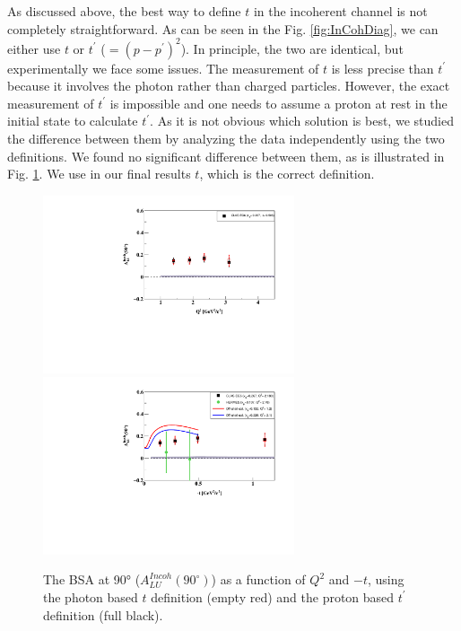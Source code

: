 \documentclass[aps,prc,preprint,superscriptaddress]{revtex4}
\begin{document}

As discussed above, the best way to define $t$ in the incoherent channel is not completely
straightforward. As can be seen in the Fig. \ref{fig:InCohDiag}, 
we can either use $t$ or $t^\prime$ ($= (p - p^\prime)^2$). In principle, the two are 
identical, but experimentally we face some issues. The measurement of $t$ is less precise than
$t^\prime$ because it involves the photon rather than charged particles. However, the 
exact measurement of $t^\prime$ is impossible and one needs to assume a proton at rest
in the initial state to calculate $t^\prime$. As it is not obvious which solution is best,
we studied the difference between them by analyzing the data independently using the two 
definitions. We found no significant difference between them, as is 
illustrated in Fig. \ref{fig:ttpComp}. We use in our final results $t$,
which is the correct definition.

\begin{figure}[tbp!]
\center
\includegraphics[width=7.4cm]{fig3/ALU_90_p_vs_Q2_shortscenrario.pdf}
\includegraphics[width=7.4cm]{fig3/ALU_90_p_vs_t_shortscenrario.pdf}
	\caption{The BSA at 90° ($A_{LU}^{Incoh} (90^\circ)$) as a
	function of $Q^2$ and $-t$, using the photon based $t$ definition (empty red)
	and the proton based $t^\prime$ definition (full black).}
\label{fig:ttpComp}
\end{figure}
\end{document}
